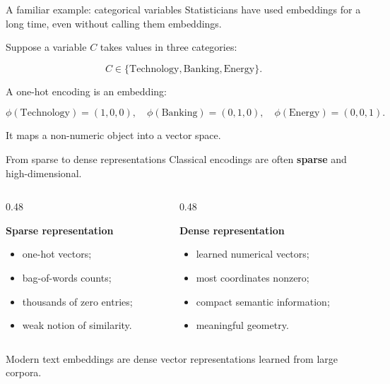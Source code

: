 \documentclass[aspectratio=169]{beamer}
\begin{document}
\begin{frame}{A familiar example: categorical variables}
\large
Statisticians have used embeddings for a long time, even without calling them embeddings.

\vspace{0.2cm}

Suppose a variable \(C\) takes values in three categories:

\[
C \in \{\text{Technology},\text{Banking},\text{Energy}\}.
\]

A one-hot encoding is an embedding:

\[
\phi(\text{Technology})=(1,0,0), \quad
\phi(\text{Banking})=(0,1,0), \quad
\phi(\text{Energy})=(0,0,1).
\]

\vspace{0.2cm}

It maps a non-numeric object into a vector space.
\end{frame}

\begin{frame}{From sparse to dense representations}
\large
Classical encodings are often \textbf{sparse} and high-dimensional.

\vspace{0.25cm}

\begin{columns}[T]
\begin{column}{0.48\textwidth}
\begin{bluebox}
\textbf{Sparse representation}
\begin{itemize}
  \item one-hot vectors;
  \item bag-of-words counts;
  \item thousands of zero entries;
  \item weak notion of similarity.
\end{itemize}
\end{bluebox}
\end{column}
\begin{column}{0.48\textwidth}
\begin{greenbox}
\textbf{Dense representation}
\begin{itemize}
  \item learned numerical vectors;
  \item most coordinates nonzero;
  \item compact semantic information;
  \item meaningful geometry.
\end{itemize}
\end{greenbox}
\end{column}
\end{columns}

\vspace{0.4cm}

Modern text embeddings are dense vector representations learned from large corpora.
\end{frame}
\end{document}
